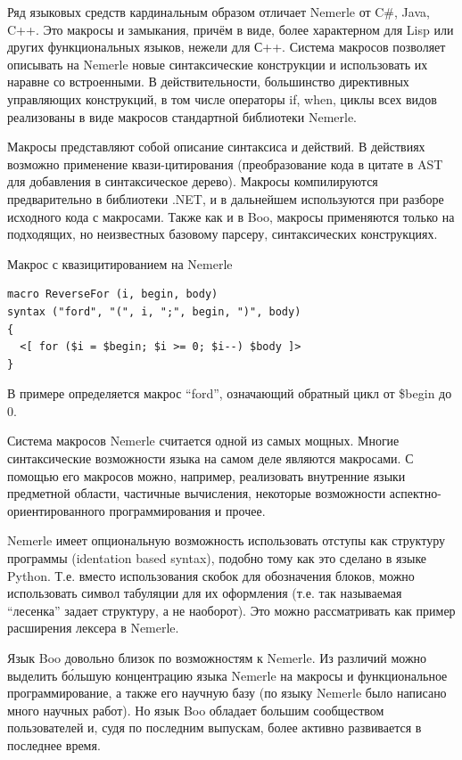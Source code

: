 \documentclass[a4paper,12pt,titlepage]{extarticle}
\begin{document}
Ряд языковых средств кардинальным образом отличает Nemerle от C\#, Java, C++.
Это макросы и замыкания, причём в виде, более характерном для Lisp или других
функциональных языков, нежели для С++. Система макросов позволяет описывать на
Nemerle новые синтаксические конструкции и использовать их наравне со
встроенными. В действительности, большинство директивных управляющих
конструкций, в том числе операторы if, when, циклы всех видов реализованы в
виде макросов стандартной библиотеки Nemerle.

Макросы представляют собой описание синтаксиса и действий. В действиях
возможно применение квази-цитирования (преобразование кода в цитате в AST для
добавления в синтаксическое дерево). Макросы компилируются предварительно в
библиотеки .NET, и в дальнейшем используются при разборе исходного кода с
макросами. Также как и в Boo, макросы применяются только на подходящих, но
неизвестных базовому парсеру, синтаксических конструкциях.

Макрос с квазицитированием на Nemerle
\begin{verbatim}
macro ReverseFor (i, begin, body) 
syntax ("ford", "(", i, ";", begin, ")", body)
{
  <[ for ($i = $begin; $i >= 0; $i--) $body ]>
}
\end{verbatim}
В примере определяется макрос ``ford'', означающий обратный цикл от \$begin до
0.

Система макросов Nemerle считается одной из самых мощных. Многие
синтаксические возможности языка на самом деле являются макросами. С помощью
его макросов можно, например, реализовать внутренние языки предметной области,
частичные вычисления, некоторые возможности аспектно-ориентированного
программирования и прочее.

Nemerle имеет опциональную возможность использовать отступы как структуру
программы (identation based syntax), подобно тому как это сделано в языке
Python. Т.е. вместо использования скобок для обозначения блоков, можно
использовать символ табуляции для их оформления (т.е. так называемая
``лесенка'' задает структуру, а не наоборот). Это можно рассматривать как
пример расширения лексера в Nemerle.

Язык Boo довольно близок по возможностям к Nemerle. Из различий можно выделить
б\'{о}льшую концентрацию языка Nemerle на макросы и функциональное
программирование, а также его научную базу (по языку Nemerle было написано много
научных работ). Но язык Boo обладает большим сообществом пользователей и, судя
по последним выпускам, более активно развивается в последнее время.
\end{document}
